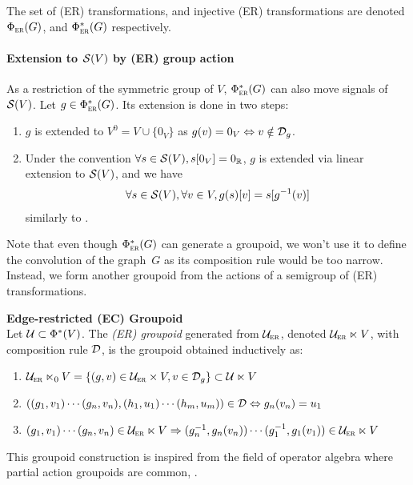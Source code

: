 The set of (ER) transformations, and injective (ER) transformations are denoted $\Phi_{\operatorname{\textsc{er}}}(G)$, and $\Phi_{\operatorname{\textsc{er}}}^*(G)$ respectively.

\paragraph{Extension to $\mathcal{S}(V)$ by (ER) group action}
As a restriction of the symmetric group of $V$, $\Phi_{\operatorname{\textsc{er}}}^*(G)$ can also move signals of $\mathcal{S}(V)$. Let $g \in \Phi_{\operatorname{\textsc{er}}}^*(G)$. Its extension is done in two steps:
\begin{enumerate}
  \item $g$ is extended to $V^0 = V \cup \{0_V\}$ as $g(v) = 0_V \Leftrightarrow v \notin \mathcal{D}_g$.
  \item Under the convention $\forall s \in \mathcal{S}(V), s[0_V] = 0_{\mathbb{R}}$, $g$ is extended via linear extension to $\mathcal{S}(V)$, and we have
  \begin{gather*}
  \forall s \in \mathcal{S}(V), \forall v \in V, g(s)[v] = s[g^{-1}(v)]
  \end{gather*}
  similarly to .
\end{enumerate}

Note that even though $\Phi_{\operatorname{\textsc{er}}}^*(G)$ can generate a groupoid, we won't use it to define the convolution of the graph~$G$ as its composition rule would be too narrow. Instead, we form another groupoid from the actions of a semigroup of (ER) transformations.

\begin{definition}\textbf{Edge-restricted (EC) Groupoid}\\
Let $\mathcal{U} \subset \Phi^*(V)$. The \emph{(ER) groupoid} generated from $\mathcal{U}_{\operatorname{\textsc{er}}}$, denoted $\mathcal{U}_{\operatorname{\textsc{er}}} \ltimes V$, with composition rule $\mathcal{D}$, is the groupoid obtained inductively as:
\begin{enumerate}
  \item $\mathcal{U}_{\operatorname{\textsc{er}}} \ltimes_0 V = \{(g,v) \in \mathcal{U}_{\operatorname{\textsc{er}}} \times V, v \in \mathcal{D}_g \} \subset \mathcal{U} \ltimes V$
  \item $((g_1,v_1) \cdots (g_n,v_n) , (h_1,u_1) \cdots (h_m,u_m)) \in \mathcal{D} \Leftrightarrow g_n(v_n) = u_1$
  \item $(g_1,v_1) \cdots (g_n,v_n) \in \mathcal{U}_{\operatorname{\textsc{er}}} \ltimes V \Rightarrow (g_n^{-1}, g_n(v_n)) \cdots (g_1^{-1}, g_1(v_1)) \in \mathcal{U}_{\operatorname{\textsc{er}}} \ltimes V$
\end{enumerate}
\end{definition}

\begin{remark}
This groupoid construction is inspired from the field of operator algebra where partial action groupoids are common, \eg \cite{nica1994groupoid,exel1998partial,li2016partial}.
\end{remark}

